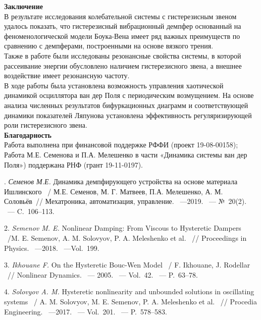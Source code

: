 \textbf{Заключение}\\
В результате исследования колебательной системы с гистерезисным звеном удалось показать, что гистерезисный вибрационный демпфер основанный на феноменологической модели Боука-Вена имеет ряд важных преимуществ по сравнению с демпферами, построенными на основе вязкого трения.\\
Также в работе были исследованы резонансные свойства системы, в которой рассеивание энергии обусловлено наличием гистерезисного звена, а внешнее воздействие имеет резонансную частоту.\\
В ходе работы была установлена возможность управления хаотической динамикой осциллятора ван дер Поля с периодическим возмущением. На основе анализа численных результатов бифуркационных диаграмм и соответствующей динамики показателей Ляпунова установлена эффективность регуляризирующей роли гистерезисного звена.\\

\textbf{Благодарность}\\
Работа выполнена при финансовой поддержке РФФИ (проект 19-08-00158);\\
Работа М.Е. Семенова и П.А. Мелешенко в части «Динамика системы ван дер Поля») поддержана РНФ (грант 19-11-0197).

. {\it Семенов М.Е.} Динамика демпфирующего устройства на основе материала Ишлинского ~/ М.Е. Семенов, М. Г. Матвеев, П.А. Мелешенко, А. М. Соловьёв~// Мехатроника, автоматизация, управление. ~---2019. ~--- №~20(2). ~--- C.~106--113.

2. {\it Semenov M. E.} Nonlinear Damping: From Viscous to Hysteretic Dampers ~/M. E. Semenov, A. M. Solovyov, P. A. Meleshenko et al. ~// Proceedings in Physics. ~---2018. ~---Vol.~199.

3. {\it Ikhouane F.} On the Hysteretic Bouc-Wen Model ~/ F. Ikhouane, J. Rodellar ~// Nonlinear Dynamics. ~--- 2005. ~--- Vol.~42. ~--- P.~63--78.

4. {\it Solovyov A. M.} Hysteretic nonlinearity and unbounded solutions in oscillating systems ~/ A. M. Solovyov, M. E. Semenov, P. A. Meleshenko et al. ~// Procedia Engineering. ~---2017. ~--- Vol.~201. ~--- P.~578--583.
